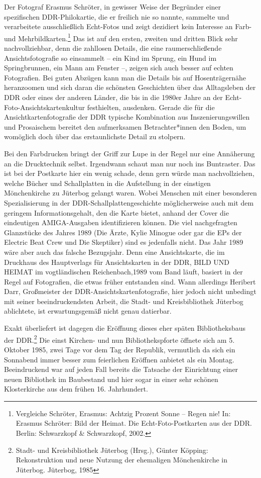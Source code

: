 \documentclass[a4paper,
fontsize=11pt,
oneside,
numbers=noperiodatend,
parskip=half-,
bibliography=totoc,
final
]{scrartcl}
\begin{document}
Der Fotograf Erasmus Schröter, in gewisser Weise der Begründer einer
spezifischen DDR-Philo\-kartie, die er freilich nie so nannte, sammelte
und verarbeitete ausschließlich Echt-Fotos und zeigt dezidiert kein
Interesse an Farb- und Mehrbildkarten.\footnote{Vergleiche Schröter,
  Erasmus: Achtzig Prozent Sonne -- Regen nie! In: Erasmus Schröter:
  Bild der Heimat. Die Echt-Foto-Postkarten aus der DDR. Berlin:
  Schwarzkopf \& Schwarzkopf, 2002.} Das ist auf den ersten, zweiten und
dritten Blick sehr nachvollziehbar, denn die zahllosen Details, die eine
raumerschließende Ansichtsfotografie so einsammelt -- ein Kind im
Sprung, ein Hund im Springbrunnen, ein Mann am Fenster --, zeigen sich
auch besser auf echten Fotografien. Bei guten Abzügen kann man die
Details bis auf Hosenträgernähe heranzoomen und sich daran die schönsten
Geschichten über das Alltagsleben der DDR oder eines der anderen Länder,
die bis in die 1980er Jahre an der Echt-Foto-Ansichtskartenkultur
festhielten, ausdenken. Gerade die für die Ansichtkartenfotografie der
DDR typische Kombination aus Inszenierungswillen und Prosaischem
bereitet den aufmerksamen Betrachter*innen den Boden, um womöglich doch
über das erstaunlichste Detail zu stolpern.

Bei den Farbdrucken bringt der Griff zur Lupe in der Regel nur eine
Annäherung an die Drucktechnik selbst. Irgendwann schaut man nur noch
ins Buntraster. Das ist bei der Postkarte hier ein wenig schade, denn
gern würde man nachvollziehen, welche Bücher und Schallplatten in die
Aufstellung in der einstigen Mönchenkirche zu Jüterbog gelangt waren.
Wobei Menschen mit einer besonderen Spezialisierung in der
DDR-Schallplattengeschichte möglicherweise auch mit dem geringem
Informationsgehalt, den die Karte bietet, anhand der Cover die
eindeutigen AMIGA-Ausgaben identifizieren können. Die viel nachgefragten
Glanzstücke des Jahres 1989 (Die Ärzte, Kylie Minogue oder gar die EPs
der Electric Beat Crew und Die Skeptiker) sind es jedenfalls nicht. Das
Jahr 1989 wäre aber auch das falsche Bezugsjahr. Denn eine
Ansichtskarte, die im Druckhaus des Hauptverlags für Ansichtskarten in
der DDR, BILD UND HEIMAT im vogtländischen Reichenbach,1989 vom Band
läuft, basiert in der Regel auf Fotografien, die etwas früher entstanden
sind. Wann allerdings Heribert Darr, Großmeister der
DDR-Ansichtskartenfotografie, hier jedoch nicht unbedingt mit seiner
beeindruckendsten Arbeit, die Stadt- und Kreisbibliothek Jüterbog
ablichtete, ist erwartungsgemäß nicht genau datierbar.

Exakt überliefert ist dagegen die Eröffnung dieses eher späten
Bibliotheksbaus der DDR.\footnote{Stadt- und Kreisbibliothek Jüterbog
  (Hrsg.), Günter Köpping: Rekonstruktion und neue Nutzung der
  ehemaligen Mönchenkirche in Jüterbog. Jüterbog, 1985} Die einst
Kirchen- und nun Bibliothekspforte öffnete sich am 5. Oktober 1985, zwei
Tage vor dem Tag der Republik, vermutlich da sich ein Sonnabend immer
besser zum feierlichen Eröffnen anbietet als ein Montag. Beeindruckend
war auf jeden Fall bereits die Tatsache der Einrichtung einer neuen
Bibliothek im Baubestand und hier sogar in einer sehr schönen
Klosterkirche aus dem frühen 16. Jahrhundert.
\end{document}
